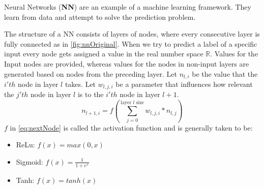 \documentclass[dissertation.tex]{subfiles}
\begin{document}
Neural Networks (\textbf{NN}) are an example of a machine learning framework. They learn
from data and attempt to solve the prediction problem.

The structure of a NN consists of layers of nodes, where every consecutive
layer is fully connected as in \autoref{fig:nnOriginal}.  When we try to
predict a label of a specific input every node gets assigned a value in the
real number space $\mathbb{R}$. Values for the Input nodes are provided,
whereas values for the nodes in non-input layers are generated based on nodes
from the preceding layer. Let $n_{l,i}$ be the value that the $i'th$ node in
layer $l$ takes. Let $w_{l,j,i}$ be a parameter that influences how relevant
the $j'th$ node in layer $l$ is to the $i'th$ node in layer $l+1$.
\begin{equation}
  n_{l+1,i} = f(\sum_{j = 0}^{\text{layer }l\text{ size}} w_{l,j,i}*n_{l,j})
  \label{eq:nextNode}
\end{equation}
$f$ in \autoref{eq:nextNode} is called the activation function and is generally 
taken to be:
\begin{itemize}
  \item{
      ReLu: $f(x) = max(0, x)$
    }
  \item{
      Sigmoid: $f(x) = \frac{1}{1+e^x}$
    }
  \item{
      Tanh: $f(x) = tanh(x)$
    }
\end{itemize}
\end{document}
